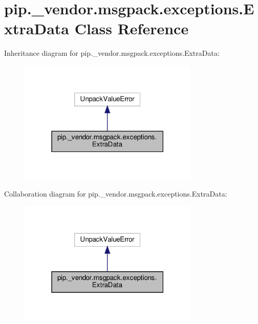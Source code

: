 \hypertarget{classpip_1_1__vendor_1_1msgpack_1_1exceptions_1_1ExtraData}{}\section{pip.\+\_\+vendor.\+msgpack.\+exceptions.\+Extra\+Data Class Reference}
\label{classpip_1_1__vendor_1_1msgpack_1_1exceptions_1_1ExtraData}


Inheritance diagram for pip.\+\_\+vendor.\+msgpack.\+exceptions.\+Extra\+Data\+:
\nopagebreak
\begin{figure}[H]
\begin{center}
\leavevmode
\includegraphics[width=243pt]{classpip_1_1__vendor_1_1msgpack_1_1exceptions_1_1ExtraData__inherit__graph}
\end{center}
\end{figure}


Collaboration diagram for pip.\+\_\+vendor.\+msgpack.\+exceptions.\+Extra\+Data\+:
\nopagebreak
\begin{figure}[H]
\begin{center}
\leavevmode
\includegraphics[width=243pt]{classpip_1_1__vendor_1_1msgpack_1_1exceptions_1_1ExtraData__coll__graph}
\end{center}
\end{figure}
